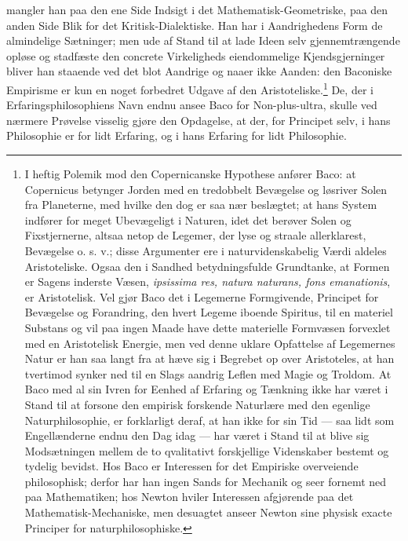 \documentclass[12pt,a4paper]{book}
\begin{document}
mangler han paa den ene Side Indsigt i det Mathematisk-Geometriske, paa
den anden Side Blik for det
Kritisk-Dialektiske. Han har i Aandrighedens Form de almindelige
Sætninger; men ude af Stand til at lade Ideen selv gjennemtrængende
opløse og stadfæste den concrete Virkeligheds eiendommelige
Kjendsgjerninger bliver han staaende ved det blot Aandrige og naaer
ikke Aanden: den Baconiske Empirisme er kun en noget forbedret Udgave
af den Aristoteliske.\footnote{%
I heftig Polemik mod den Copernicanske Hypothese anfører Baco: at
Copernicus betynger Jorden med en tredobbelt Bevægelse og løsriver
Solen fra Planeterne, med hvilke den dog er saa nær beslægtet; at hans
System indfører for meget Ubevægeligt i Naturen, idet det berøver Solen
og Fixstjernerne, altsaa netop de Legemer, der lyse og straale
allerklarest, Bevægelse o. s. v.; disse Argumenter ere i
naturvidenskabelig Værdi aldeles Aristoteliske. Ogsaa den i Sandhed
betydningsfulde Grundtanke, at Formen er Sagens inderste Væsen,
\textit{ipsissima res, natura naturans, fons emanationis}, er
Aristotelisk. Vel gjør Baco det i Legemerne Formgivende, Principet for
Bevægelse og Forandring, den hvert Legeme iboende Spiritus, til en
materiel Substans og vil paa ingen Maade have dette materielle
Formvæsen forvexlet med en Aristotelisk Energie, men ved denne uklare
Opfattelse af Legemernes Natur er han saa langt fra at hæve sig i
Begrebet op over Aristoteles, at han tvertimod synker ned til en Slags
aandrig Leflen med Magie og Troldom. At Baco med al sin Ivren for
Eenhed af Erfaring og Tænkning ikke har været i Stand til at forsone
den empirisk forskende Naturlære med den egenlige Naturphilosophie, er
forklarligt deraf, at han ikke for sin Tid --- saa lidt som
Engellænderne endnu den Dag idag --- har været i Stand til at blive sig
Modsætningen mellem de to qvalitativt forskjellige Videnskaber bestemt
og tydelig bevidst. Hos Baco er Interessen for det Empiriske
overveiende philosophisk; derfor har han ingen Sands for Mechanik og
seer fornemt ned paa Mathematiken; hos Newton hviler Interessen
afgjørende paa det Mathematisk-Mechaniske, men desuagtet anseer Newton
sine physisk exacte Principer for naturphilosophiske.} De, der i
Erfaringsphilosophiens Navn
endnu ansee Baco for Non-plus-ultra, skulle ved nærmere Prøvelse
visselig gjøre den Opdagelse, at der, for Principet selv, i hans
Philosophie er for lidt Erfaring, og i hans Erfaring for lidt
Philosophie.
\end{document}
